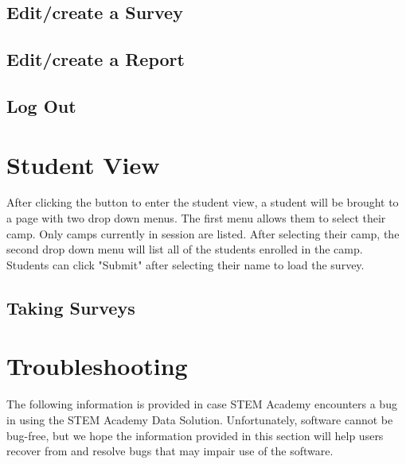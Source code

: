 \documentclass[letterpaper,10pt,serif, draftclsnofoot,onecolumn, compsoc, titlepage]{IEEEtran}
\begin{document}
\subsection{Edit/create a Survey}
\subsection{Edit/create a Report}
\subsection{Log Out}

\section{Student View}
After clicking the button to enter the student view, a student will be brought to a page with two drop down menus.
The first menu allows them to select their camp.
Only camps currently in session are listed.
After selecting their camp, the second drop down menu will list all of the students enrolled in the camp.
Students can click "Submit" after selecting their name to load the survey.
\subsection{Taking Surveys}

\section{Troubleshooting}
The following information is provided in case STEM Academy encounters a bug in using the STEM Academy Data Solution.
Unfortunately, software cannot be bug-free, but we hope the information provided in this section will help users recover from and resolve bugs that may impair use of the software.
\end{document}
